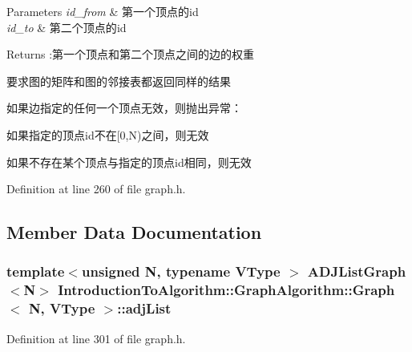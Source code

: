 \begin{DoxyParams}{Parameters}
{\em id\+\_\+from} & 第一个顶点的{\ttfamily id} \\
\hline
{\em id\+\_\+to} & 第二个顶点的{\ttfamily id} \\
\hline
\end{DoxyParams}
\begin{DoxyReturn}{Returns}
\+:第一个顶点和第二个顶点之间的边的权重
\end{DoxyReturn}
要求图的矩阵和图的邻接表都返回同样的结果

如果边指定的任何一个顶点无效，则抛出异常：


\begin{DoxyItemize}
\item 如果指定的顶点{\ttfamily id}不在{\ttfamily \mbox{[}0,N)}之间，则无效
\item 如果不存在某个顶点与指定的顶点{\ttfamily id}相同，则无效 
\end{DoxyItemize}

Definition at line 260 of file graph.\+h.



\subsection{Member Data Documentation}
\hypertarget{struct_introduction_to_algorithm_1_1_graph_algorithm_1_1_graph_a4442db9dd1bbb7fe543353df4fa1ba9f}{}
\subsubsection[{adj\+List}]{\setlength{\rightskip}{0pt plus 5cm}template$<$unsigned N, typename V\+Type $>$ {\bf A\+D\+J\+List\+Graph}$<$N$>$ {\bf Introduction\+To\+Algorithm\+::\+Graph\+Algorithm\+::\+Graph}$<$ N, V\+Type $>$\+::adj\+List}\label{struct_introduction_to_algorithm_1_1_graph_algorithm_1_1_graph_a4442db9dd1bbb7fe543353df4fa1ba9f}


Definition at line 301 of file graph.\+h.

\hypertarget{struct_introduction_to_algorithm_1_1_graph_algorithm_1_1_graph_a498323460ec613f12e1039afdca6c10a}{}
